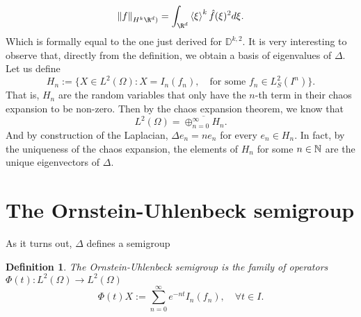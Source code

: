 \documentclass[12pt]{article}
\newtheorem{definition}{Definition}
\newcommand{\br}[1]{\left\langle#1\right\rangle}
\begin{document}
\begin{CJK*}{UTF8}{gbsn}
\begin{equation*}
		\norm{f}_{H^k\R^d)}=\int_{\R^d}\br{\xi }^k \hat{f}(\xi )^2d\xi .
	\end{equation*}
	Which is formally equal to the one just derived for $\mathbb{D}^{k,2}.$ It is very interesting to observe that, directly from the definition, we obtain a basis of eigenvalues of $\Delta $. Let us define
	\begin{equation*}
		H_n:=\{X\in L^2(\Omega): X=I_n(f_n),\quad \text{for some } f_n \in L^2_S(I^n)  \} .
	\end{equation*}
	That is, $H_n$ are the random variables that only have the  $n$-th term in their chaos expansion to be non-zero. Then by the chaos expansion theorem, we know that
	\begin{equation*}
		L^2(\Omega)=\overline{\oplus_{n=0}^\infty H_n}.
	\end{equation*}
	And by construction of the Laplacian, $\Delta e_n=n e_n$ for every $e_n \in H_n$. In fact, by the uniqueness of the chaos expansion, the elements of $H_n$ for some  $n \in \mathbb{N}$ are the unique eigenvectors of $\Delta .$
	\section{The Ornstein-Uhlenbeck semigroup}
	As it turns out, $\Delta $ defines a semigroup
	\begin{definition}
		The \emph{Ornstein-Uhlenbeck semigroup} is the family of operators $\Phi(t):L^2(\Omega)\to L^2(\Omega)$
		\begin{equation*}
			\Phi(t)X:=\sum_{n=0}^{\infty}  e^{-nt}I_n(f_n),  \quad\forall t\in I.
		\end{equation*}


\end{definition}
\end{CJK*}
\end{document}
